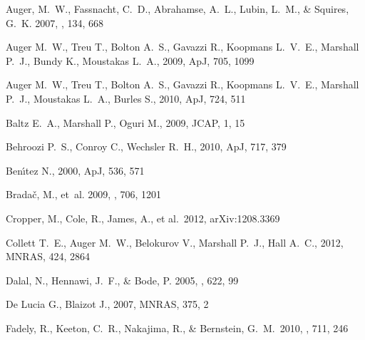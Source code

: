 \begin{thebibliography}{99}


{Auger}, M.~W., {Fassnacht}, C.~D., {Abrahamse}, A.~L., {Lubin}, L.~M., \&
  {Squires}, G.~K. 2007, \aj, 134, 668


Auger M.~W., Treu T., Bolton A.~S., Gavazzi R., Koopmans L.~V.~E., Marshall 
P.~J., Bundy K., Moustakas L.~A., 2009, ApJ, 705, 1099 


Auger M.~W., Treu T., Bolton A.~S., Gavazzi R., Koopmans L.~V.~E., Marshall 
P.~J., Moustakas L.~A., Burles S., 2010, ApJ, 724, 511 


 Baltz E.~A., Marshall P., Oguri M., 2009, JCAP, 1, 15 


 Behroozi P.~S., Conroy C., Wechsler R.~H., 2010, ApJ, 717, 379 


 Ben{\'{\i}}tez N., 2000, ApJ, 536, 571 


{Brada{\v c}}, M., {et~al.} 2009, \apj, 706, 1201

 Cropper, M., Cole, R., 
James, A., et al.\ 2012, arXiv:1208.3369 


 Collett T.~E., Auger M.~W., Belokurov V., 
Marshall P.~J., Hall A.~C., 2012, MNRAS, 424, 2864 




{Dalal}, N., {Hennawi}, J.~F., \& {Bode}, P. 2005, \apj, 622, 99


 De Lucia G., Blaizot J., 2007, MNRAS, 375, 2 


 Fadely, R., Keeton, 
C.~R., Nakajima, R., \& Bernstein, G.~M.\ 2010, \apj, 711, 246 



\end{thebibliography}
